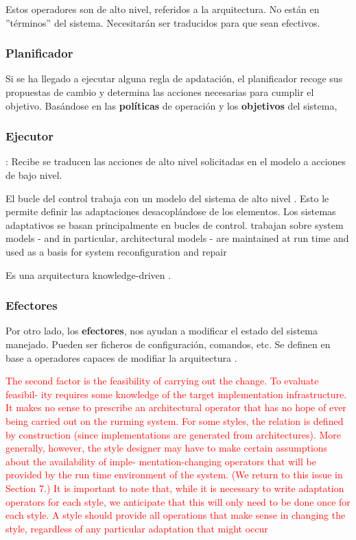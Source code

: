 Estos operadores son de alto nivel, referidos a la arquitectura. No están en ''términos'' del sistema. Necesitarán ser traducidos para que sean efectivos.

\subsubsection{Planificador}
Si se ha llegado a ejecutar alguna regla de apdatación, el planificador recoge sus propuestas de cambio y determina las acciones necesarias para cumplir el objetivo. Basándose en las \textbf{políticas} de operación y los \textbf{objetivos} del sistema,

\subsubsection{Ejecutor}

: Recibe se traducen las acciones de alto nivel solicitadas en el modelo a acciones de bajo nivel.

El bucle del control trabaja con un modelo del sistema de alto nivel \cite{garlanIncreasingSystemDependability2003}. Esto le permite definir las adaptaciones desacoplándose de los elementos. Los sistemas adaptativos se basan principalmente en bucles de control. trabajan sobre system models - and in particular, architectural models - are maintained at run time
and used as a basis for system reconfiguration and repair \cite{garlanIncreasingSystemDependability2003}

Es una arquitectura knowledge-driven \cite{taylorSoftwareArchitectureFoundations2009}.

\subsubsection{Efectores}

Por otro lado, los \textbf{efectores}, nos ayudan a modificar el estado del sistema manejado. Pueden ser ficheros de configuración, comandos, etc. Se definen en base a operadores capaces de modifiar la arquitectura \cite{garlanIncreasingSystemDependability2003}.

\textcolor{red}{The second factor is the feasibility of carrying out the change. To evaluate feasibil-
ity requires some knowledge of the target implementation infrastructure. It makes no
sense to prescribe an architectural operator that has no hope of ever being carried out
on the rurming system. For some styles, the relation is defined by construction (since
implementations are generated from architectures). More generally, however, the
style designer may have to make certain assumptions about the availability of imple-
mentation-changing operators that will be provided by the run time environment of
the system. (We return to this issue in Section 7.)
It is important to note that, while it is necessary to write adaptation operators for
each style, we anticipate that this will only need to be done once for each style. A
style should provide all operations that make sense in changing the style, regardless of
any particular adaptation that might occur\cite{garlanIncreasingSystemDependability2003}}


